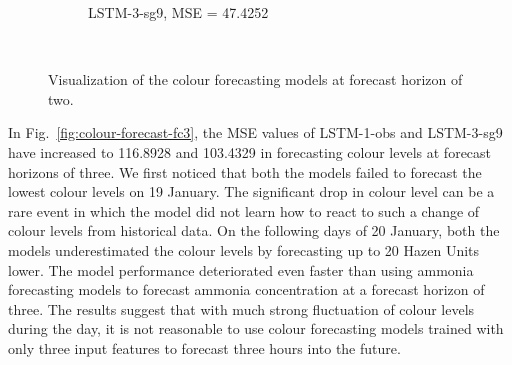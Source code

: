 \begin{figure}[!ht]
\begin{subfigure}[t]{0.7\textwidth}
    \caption{LSTM-3-sg9, MSE = 47.4252} \label{fig:colour-lstm-3-fc2}
  \end{subfigure}\\
\caption{Visualization of the colour forecasting models at forecast horizon of two.} \label{fig:colour-forecast-fc2}
\end{figure}

In Fig.~\ref{fig:colour-forecast-fc3}, the MSE values of LSTM-1-obs and LSTM-3-sg9 have increased to 116.8928 and 103.4329 in forecasting colour levels at forecast horizons of three. We first noticed that both the models failed to forecast the lowest colour levels on 19 January. The significant drop in colour level can be a rare event in which the model did not learn how to react to such a change of colour levels from historical data. On the following days of 20 January, both the models underestimated the colour levels by forecasting up to 20 Hazen Units lower. The model performance deteriorated even faster than using ammonia forecasting models to forecast ammonia concentration at a forecast horizon of three. The results suggest that with much strong fluctuation of colour levels during the day, it is not reasonable to use colour forecasting models trained with only three input features to forecast three hours into the future.

